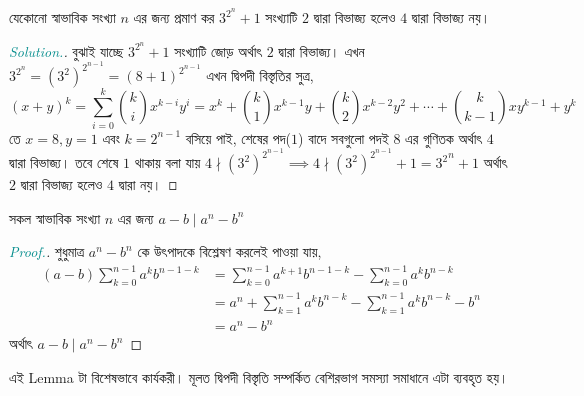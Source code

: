 \documentclass[a4paper,11pt]{article}
\newenvironment{sltn}{\begin{proof}[\emph{\textcolor{darkcyan}{Solution.}}]} {\end{proof}}
\newenvironment{prf}{\begin{proof}[\emph{\textcolor{darkcyan}{Proof.}}]} {\end{proof}}
\begin{document}
\begin{xmpl}
	\label{2-div-3n}
	যেকোনো স্বাভাবিক সংখ্যা $n$ এর জন্য প্রমাণ কর $3^{2^{n}}+1$ সংখ্যাটি $2$ দ্বারা বিভাজ্য হলেও $4$ দ্বারা বিভাজ্য নয়। 
\end{xmpl}
\begin{sltn}
	বুঝাই যাচ্ছে $3^{2^{n}}+1$ সংখ্যাটি জোড় অর্থাৎ $2$ দ্বারা বিভাজ্য। এখন $3^{2^n}=(3^2)^{2^{n-1}}=(8+1)^{2^{n-1}}$ এখন দ্বিপদী বিস্তৃতির সুত্র,
	\[(x+y)^k=\sum_{i=0}^{k} {k \choose i} x^{k-i}y^i= x^k+{k \choose 1} x^{k-1}y+{k \choose 2} x^{k-2}y^2+\cdots + {k \choose {k-1}} xy^{k-1}+y^k\]
	তে $x=8, y=1$ এবং $k=2^{n-1}$ বসিয়ে পাই, শেষের পদ($1$) বাদে সবগুলো পদই $8$ এর গুণিতক অর্থাৎ $4$ দ্বারা বিভাজ্য। তবে শেষে $1$ থাকায় বলা যায় $4 \nmid {(3^2)}^{2^{n-1}}\implies 4 \nmid {(3^2)}^{2^{n-1}}+1={3^2}^{n}+1$ অর্থাৎ $2$ দ্বারা বিভাজ্য হলেও $4$ দ্বারা নয়। 
\end{sltn}
\begin{lma}
	\label{binomial}
	সকল স্বাভাবিক সংখ্যা $n$ এর জন্য $a-b \mid a^n-b^n$
\end{lma}
\begin{prf}
	শুধুমাত্র $a^n-b^n$ কে উৎপাদকে বিশ্লেষণ করলেই পাওয়া যায়, 
	\begin{align*}
		(a-b)\sum_{k=0}^{n-1} a^kb^{n-1-k} & = \sum_{k=0}^{n-1} a^{k+1}b^{n-1-k}-\sum_{k=0}^{n-1} a^kb^{n-k}  \\
		                                   & =a^n+\sum_{k=1}^{n-1} a^kb^{n-k}-\sum_{k=1}^{n-1} a^kb^{n-k}-b^n \\
		                                   & =a^n-b^n
	\end{align*}
	অর্থাৎ $a-b \mid a^n-b^n$
\end{prf}
এই Lemma টা বিশেষভাবে কার্যকরী। মূলত দ্বিপদী বিস্তৃতি সম্পর্কিত বেশিরভাগ সমস্যা সমাধানে এটা ব্যবহৃত হয়। 
\end{document}
